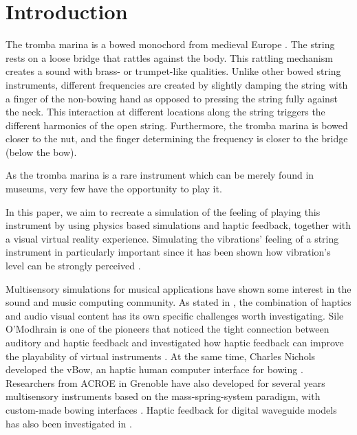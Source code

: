 \documentclass[dvipsnames, pdftex]{article}
\title{\papertitle}
\def\SWcomment[#1]{\textcolor{Red}{#1}}
\def\RPcomment[#1]{\textcolor{Blue}{#1}}
\def\SScomment[#1]{\textcolor{OliveGreen}{#1}}
\begin{document}
%
\capstartfalse
\maketitle
\capstarttrue
%
\begin{abstract}
Tromba stuff Phantom omni

PHANTOM Omni for control and haptic feedback.

This paper presents the implementation and the evaluation of a VR bowed string instrument.  
Quick results

Commenting in colours :O \SWcomment[Silvin]{} \RPcomment[Razvan]{} \SScomment[Stefania]{}
\end{abstract}
%

\section{Introduction}\label{sec:introduction}
The tromba marina is a bowed monochord from medieval Europe \cite{encyclopaedia2020}. The string rests on a loose bridge that rattles against the body. This rattling mechanism creates a sound with brass- or trumpet-like qualities. Unlike other bowed string instruments, different frequencies are created by slightly damping the string with a finger of the non-bowing hand as opposed to pressing the string fully against the neck. This interaction at different locations along the string triggers the different harmonics of the open string. Furthermore, the tromba marina is bowed closer to the nut, and the finger determining the frequency is closer to the bridge (below the bow).

As the tromba marina is a rare instrument which can be merely found in museums, very few have the opportunity to play it.

In this paper, we aim to recreate a simulation of the feeling of playing this instrument by using physics based simulations and haptic feedback, together with a visual virtual reality experience.
Simulating the vibrations' feeling of a string instrument in particularly important since it has been shown how vibration's level can be strongly perceived \cite{askenfelt1992vibration}. 

Multisensory simulations for musical applications have shown some interest in the sound and music computing community. 
As stated in 
\cite{danieau2012enhancing}, the combination of haptics and audio visual content has its own specific challenges worth investigating.
Sile O'Modhrain is one of the pioneers that noticed the tight connection between auditory and haptic feedback and investigated how haptic feedback can improve the playability of virtual instruments \cite{o2001playing}.
At the same time, Charles Nichols developed the vBow, an haptic human computer interface for bowing \cite{nichols2002vbow}.
Researchers from ACROE in Grenoble have also developed for several years multisensory instruments based on the mass-spring-system paradigm, with custom-made bowing interfaces \cite{florens1990modeles,luciani2005action}.
Haptic feedback for digital waveguide models has also been investigated in \cite{sinclair2009audio}.
\end{document}
